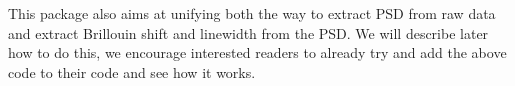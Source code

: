 \documentclass[letterpaper,10pt,english]{sphinxmanual}
\begin{document}
\begin{sphinxVerbatim}[commandchars=\\\{\}]

           
\end{sphinxVerbatim}

\sphinxAtStartPar
This package also aims at unifying both the way to extract PSD from raw data and extract Brillouin shift and linewidth from the PSD. We will describe later how to do this, we encourage interested readers to already try and add the above code to their code and see how it works.
\end{document}
